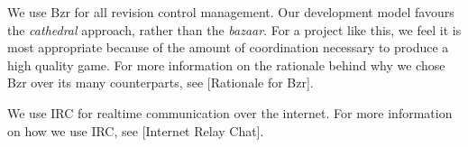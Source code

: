 

\startitemize[4]

We use Bzr for all revision control management. Our development model favours the {\it cathedral} approach, rather than the {\it bazaar}. For a project like this, we feel it is most appropriate because of the amount of coordination necessary to produce a high quality game. For more information on the rationale behind why we chose Bzr over its many counterparts, see [Rationale for Bzr].


We use IRC for realtime communication over the internet. For more information on how we use IRC, see [Internet Relay Chat].
\stopitemize

